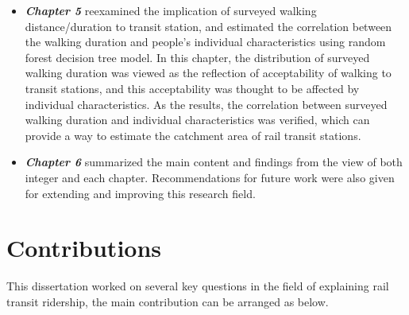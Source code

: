 \begin{itemize}
	\item \emph{\textbf{Chapter 5}} reexamined the implication of surveyed walking distance/duration to transit station, and estimated the correlation between the walking duration and people's individual characteristics using random forest decision tree model. In this chapter, the distribution of surveyed walking duration was viewed as the reflection of acceptability of walking to transit stations, and this acceptability was thought to be affected by individual characteristics. As the results, the correlation between surveyed walking duration and individual characteristics was verified, which can provide a way to estimate the catchment area of rail transit stations.
	
	\item \emph{\textbf{Chapter 6}} summarized the main content and findings from the view of both integer and each chapter. Recommendations for future work were also given for extending and improving this research field.
\end{itemize}

\section{Contributions}

This dissertation worked on several key questions in the field of explaining rail transit ridership, the main contribution can be arranged as below.

